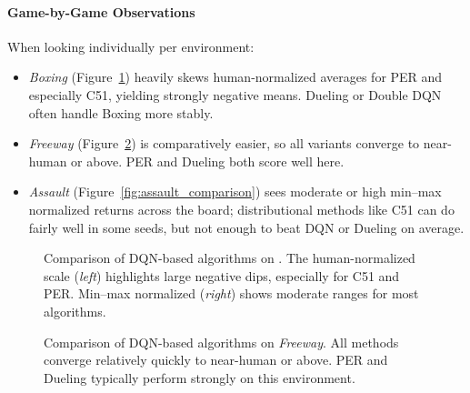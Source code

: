 \paragraph{Game-by-Game Observations}
When looking individually per environment:
\begin{itemize}
	\item \emph{Boxing} (Figure~\ref{fig:boxing_comparison}) heavily skews human-normalized averages for PER and especially C51, 
	yielding strongly negative means. 
	Dueling or Double DQN often handle Boxing more stably.
	\item \emph{Freeway} (Figure~\ref{fig:freeway_comparison}) is comparatively easier, so all variants converge to near-human or above. 
	PER and Dueling both score well here. 
	\item \emph{Assault} (Figure~\vref{fig:assault_comparison}) sees moderate or high min--max normalized returns across the board; 
	distributional methods like C51 can do fairly well in some seeds, but not enough to beat DQN or Dueling on average.
\end{itemize}

\begin{figure}
	\centering
	\quad
	\caption{Comparison of DQN-based algorithms on . 
		The human-normalized scale (\textit{left}) highlights large negative dips, especially for C51 and PER. 
		Min--max normalized (\textit{right}) shows moderate ranges for most algorithms.}
	\label{fig:boxing_comparison}
\end{figure}

\begin{figure}
	\centering
	\quad
	\caption{Comparison of DQN-based algorithms on \textit{Freeway}. 
		All methods converge relatively quickly to near-human or above. 
		PER and Dueling typically perform strongly on this environment.}
	\label{fig:freeway_comparison}
\end{figure}

